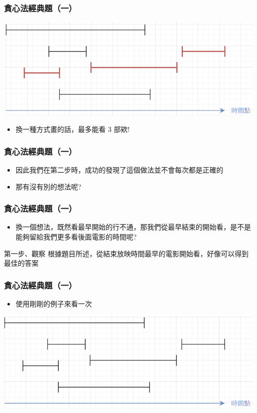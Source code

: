 \documentclass[aspectratio=169]{beamer}
\begin{document}
\begin{frame}
\frametitle{貪心法經典題（一）}
    \begin{center}
        \includegraphics[scale=0.75]{images/movie_festival_5.png}
    \end{center}
    
    \begin{itemize}
    \item<1-> 換一種方式畫的話，最多能看 $3$ 部欸!
    \end{itemize}
\end{frame}

\begin{frame}
\frametitle{貪心法經典題（一）}
    \begin{itemize}
    \item<1-> 因此我們在第二步時，成功的發現了這個做法並不會每次都是正確的
    \item<2-> 那有沒有別的想法呢?
    \end{itemize}
\end{frame}

\begin{frame}
\frametitle{貪心法經典題（一）}
    \begin{itemize}
    \item<1-> 換一個想法，既然看最早開始的行不通，那我們從最早結束的開始看，是不是能夠留給我們更多看後面電影的時間呢?
    \end{itemize}
    \begin{alertblock}{第一步、觀察}
        根據題目所述，從結束放映時間最早的電影開始看，好像可以得到最佳的答案
    \end{alertblock}
\end{frame}

\begin{frame}
\frametitle{貪心法經典題（一）}
    \begin{itemize}
    \item<1-> 使用剛剛的例子來看一次
    \end{itemize}
    \begin{center}
        \includegraphics[scale=0.75]{images/movie_festival_3.png}
    \end{center}
\end{frame}
\end{document}
